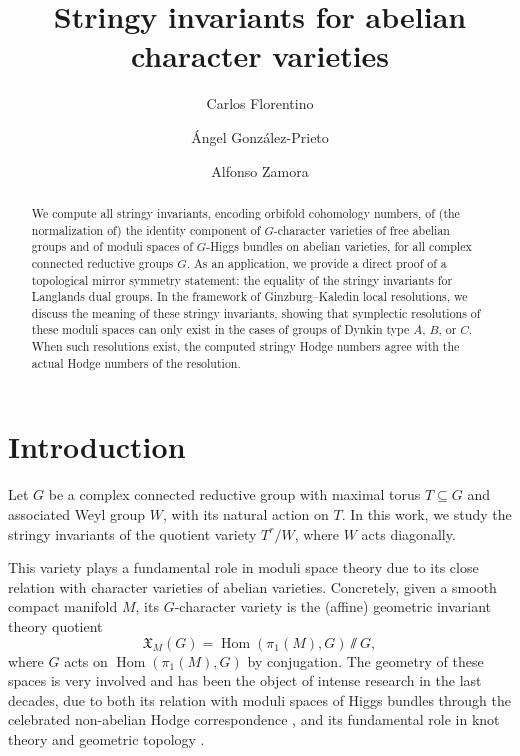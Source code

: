 \documentclass[11pt,english]{amsart}
\title{Stringy invariants for abelian character varieties}
\author[C. Florentino]{Carlos Florentino}
\author[\'A. Gonz\'alez-Prieto]{\'Angel Gonz\'alez-Prieto}
\author[A. Zamora]{Alfonso Zamora}
\numberwithin{equation}{section}
\numberwithin{figure}{section}
\theoremstyle{plain}
\theoremstyle{plain}
\theoremstyle{definition}
\theoremstyle{remark}
\newcommand{\Hom}{\operatorname{Hom}}
\begin{document}
\begin{abstract}
We compute all stringy invariants, encoding orbifold cohomology numbers, of (the normalization of) the identity component of $G$-character varieties of free abelian groups and of moduli spaces of $G$-Higgs bundles on abelian varieties, for all complex connected reductive groups $G$. As an application, we provide a direct proof of a topological mirror symmetry statement: the equality of the stringy invariants for Langlands dual groups. In the framework of Ginzburg--Kaledin local resolutions, we discuss the meaning of these stringy invariants, showing that symplectic resolutions of these moduli spaces can only exist in the cases of groups of Dynkin type $A$, $B$, or $C$. When such resolutions exist, the computed stringy Hodge numbers agree with the actual Hodge numbers of the resolution.
\end{abstract}

\maketitle


\section{Introduction}

Let $G$ be a complex connected reductive group with maximal torus $T \subseteq G$ and associated Weyl group $W$, with its natural action on $T$. In this work, we study the stringy invariants of the quotient variety $T^r/W$, where $W$ acts diagonally.

This variety plays a fundamental role in moduli space theory due to its close relation with character varieties of abelian varieties. Concretely, given a smooth compact manifold $M$, its $G$-character variety is the (affine) geometric invariant theory quotient
$$
    \mathfrak{X}_M(G) = \Hom(\pi_1(M), G) \sslash G,
$$
where $G$ acts on $\Hom(\pi_1(M), G)$ by conjugation. The geometry of these spaces is very involved and has been the object of intense research in the last decades, due to both its relation with moduli spaces of Higgs bundles through the celebrated non-abelian Hodge correspondence \cite{simpson1992higgs}, and its fundamental role in knot theory and geometric topology \cite{culler1983varieties,Si}.
\end{document}
